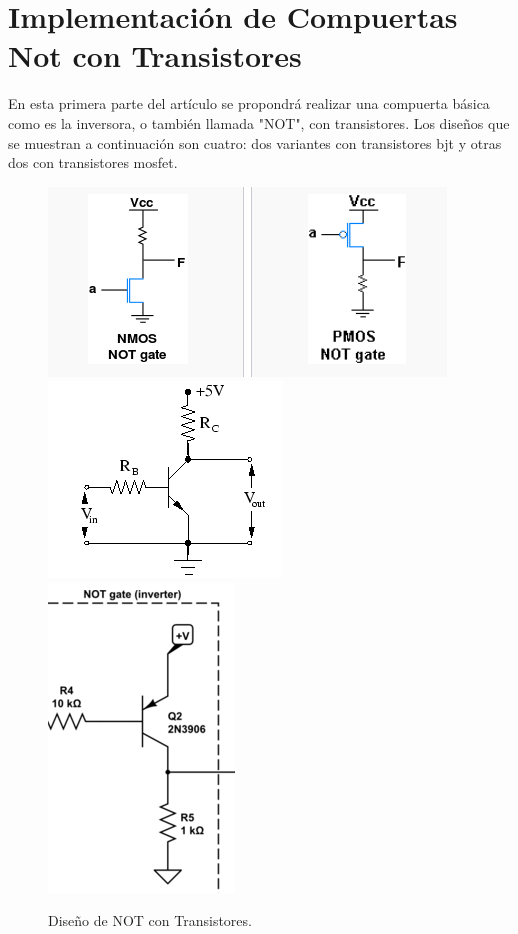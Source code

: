 \section{Implementación de Compuertas Not con Transistores}

En esta primera parte del artículo se propondrá realizar una compuerta
básica como es la inversora, o también llamada "NOT", con transistores.
Los diseños que se muestran a continuación son cuatro: dos variantes
con transistores bjt y otras dos con transistores mosfet.

\begin{figure}[H]
\begin{centering}
\includegraphics[scale=0.4]{mosNOT.PNG}
\qquad
\includegraphics[scale=0.4]{npnNOT.PNG}
\qquad
\includegraphics[scale=0.4]{pnpNOT.PNG}
\qquad
\par\end{centering}
\caption{Diseño de NOT con Transistores.}

\end{figure}

